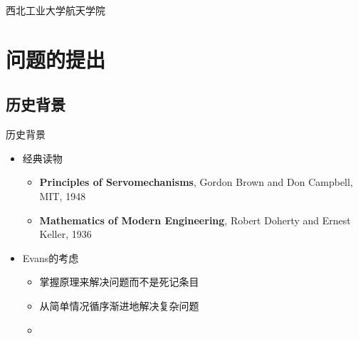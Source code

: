\DeclareMathOperator*{\argmin}{arg\,min}

\usetikzlibrary{shapes,arrows,positioning}
\newcommand{\vect}[1]{\boldsymbol{#1}}

\def\lecturename{自动控制原理}

\title{\insertlecture}

\author{邢超}

\institute
{
  西北工业大学航天学院
}


\subtitle{根轨迹法的基本概念}
\date{2013}



\begin{frame}
  \maketitle
\end{frame}


\section{问题的提出}

\subsection{历史背景}
\begin{frame}{历史背景}
\begin{itemize}
\item 经典读物
\begin{itemize}
\item \textbf{Principles of Servomechanisms}, Gordon Brown and Don Campbell, MIT, 1948
\item \textbf{Mathematics of Modern Engineering}, Robert Doherty and Ernest Keller, 1936
\end{itemize}
\item<2-> Evans的考虑
\begin{itemize}
\item<3-> 掌握原理来解决问题而不是死记条目
\item<4-> 从简单情况循序渐进地解决复杂问题
\item<5-> \color{red}{绘制图形使数学方程形象化}
\end{itemize}
\end{itemize}
\end{frame}

